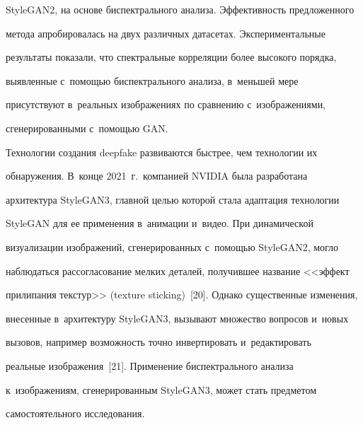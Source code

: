 StyleGAN2, на основе биспектрального анализа. Эф\-фек\-тив\-ность предложенного 


метода апробировалась на двух различных датасетах. Экспериментальные 


результаты показали, что спект\-раль\-ные корреляции более высокого порядка, 


выявленные с~помощью биспектрального анализа, в~меньшей мере 


присутствуют в~реальных изображениях по сравнению с~изображениями, 


сгенерированными с~по\-мощью GAN. 


   


  Технологии создания deepfake развиваются быстрее, чем технологии их 


обнаружения. В~конце 2021~г.\ компанией NVIDIA была разработана 


архитектура \mbox{StyleGAN3}, главной целью которой стала адаптация технологии 


\mbox{StyleGAN} для ее применения в~анимации и~видео. При динамической 


визуализации изоб\-ра\-же\-ний, сгенерированных с~по\-мощью \mbox{StyleGAN2}, могло 


наблюдаться рассогласование мелких деталей, получившее название <<эффект 


прилипания текстур>> (texture sticking)~[20]. Однако существенные изменения, 


внесенные в~архитектуру \mbox{StyleGAN3}, вызывают множество вопросов и~новых 


вызовов, например воз\-мож\-ность точ\-но инвертировать и~редактировать 


реальные изображения~[21]. Применение би\-спект\-раль\-но\-го анализа 


к~изображениям, сгенерированным \mbox{StyleGAN3}, может стать пред\-ме\-том 


самостоятельного исследования.


  


  \vspace*{-4pt}


  


  



